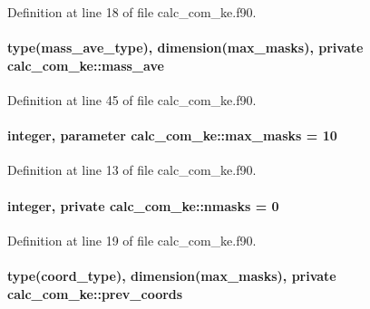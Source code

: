 Definition at line 18 of file calc\-\_\-com\-\_\-ke.\-f90.

\hypertarget{classcalc__com__ke_a3f05fe3d94a0af06d38aa7d063ccacc4}{
\paragraph[{mass\-\_\-ave}]{\setlength{\rightskip}{0pt plus 5cm}type({\bf mass\-\_\-ave\-\_\-type}), dimension({\bf max\-\_\-masks}), private calc\-\_\-com\-\_\-ke\-::mass\-\_\-ave\hspace{0.3cm}{\ttfamily [private]}}}\label{classcalc__com__ke_a3f05fe3d94a0af06d38aa7d063ccacc4}


Definition at line 45 of file calc\-\_\-com\-\_\-ke.\-f90.

\hypertarget{classcalc__com__ke_aa0ccd626cbe2c83360fc3f3f322a49e3}{
\paragraph[{max\-\_\-masks}]{\setlength{\rightskip}{0pt plus 5cm}integer, parameter calc\-\_\-com\-\_\-ke\-::max\-\_\-masks = 10}}\label{classcalc__com__ke_aa0ccd626cbe2c83360fc3f3f322a49e3}


Definition at line 13 of file calc\-\_\-com\-\_\-ke.\-f90.

\hypertarget{classcalc__com__ke_a0c21c8581f9203021d13114bb2febf6f}{
\paragraph[{nmasks}]{\setlength{\rightskip}{0pt plus 5cm}integer, private calc\-\_\-com\-\_\-ke\-::nmasks = 0\hspace{0.3cm}{\ttfamily [private]}}}\label{classcalc__com__ke_a0c21c8581f9203021d13114bb2febf6f}


Definition at line 19 of file calc\-\_\-com\-\_\-ke.\-f90.

\hypertarget{classcalc__com__ke_aa0c81fdb3bca271a5cbd1d8db205dd9d}{
\paragraph[{prev\-\_\-coords}]{\setlength{\rightskip}{0pt plus 5cm}type({\bf coord\-\_\-type}), dimension({\bf max\-\_\-masks}), private calc\-\_\-com\-\_\-ke\-::prev\-\_\-coords\hspace{0.3cm}{\ttfamily [private]}}}\label{classcalc__com__ke_aa0c81fdb3bca271a5cbd1d8db205dd9d}


